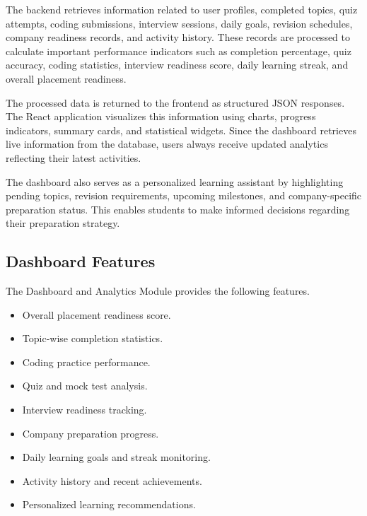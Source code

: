 The backend retrieves information related to user profiles, completed topics, quiz attempts, coding submissions, interview sessions, daily goals, revision schedules, company readiness records, and activity history. These records are processed to calculate important performance indicators such as completion percentage, quiz accuracy, coding statistics, interview readiness score, daily learning streak, and overall placement readiness.

The processed data is returned to the frontend as structured JSON responses. The React application visualizes this information using charts, progress indicators, summary cards, and statistical widgets. Since the dashboard retrieves live information from the database, users always receive updated analytics reflecting their latest activities.

The dashboard also serves as a personalized learning assistant by highlighting pending topics, revision requirements, upcoming milestones, and company-specific preparation status. This enables students to make informed decisions regarding their preparation strategy.

\subsection{Dashboard Features}

The Dashboard and Analytics Module provides the following features.

\begin{itemize}

\item Overall placement readiness score.

\item Topic-wise completion statistics.

\item Coding practice performance.

\item Quiz and mock test analysis.

\item Interview readiness tracking.

\item Company preparation progress.

\item Daily learning goals and streak monitoring.

\item Activity history and recent achievements.

\item Personalized learning recommendations.

\end{itemize}

